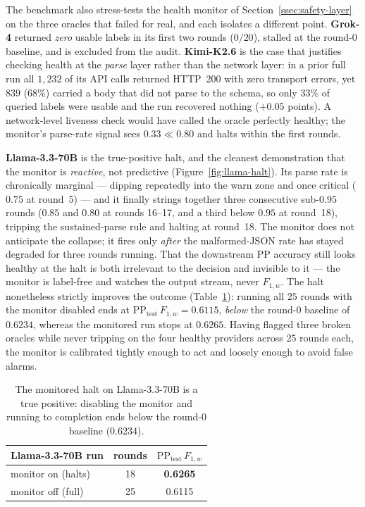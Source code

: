 The benchmark also stress-tests the health monitor of
Section~\ref{ssec:safety-layer} on the three oracles that failed for real, and
each isolates a different point. \textbf{Grok-4} returned \emph{zero} usable
labels in its first two rounds ($0/20$), stalled at the round-0 baseline, and is
excluded from the audit. \textbf{Kimi-K2.6} is the case that justifies checking
health at the \emph{parse} layer rather than the network layer: in a prior full
run all $1{,}232$ of its API calls returned HTTP~200 with zero transport errors,
yet $839$ ($68\%$) carried a body that did not parse to the schema, so only $33\%$
of queried labels were usable and the run recovered nothing ($+0.05$ points). A
network-level liveness check would have called the oracle perfectly healthy; the
monitor's parse-rate signal sees $0.33 \ll 0.80$ and halts within the first
rounds.

\textbf{Llama-3.3-70B} is the true-positive halt, and the cleanest demonstration
that the monitor is \emph{reactive}, not predictive (Figure~\ref{fig:llama-halt}).
Its parse rate is chronically marginal --- dipping repeatedly into the warn zone
and once critical ($0.75$ at round~5) --- and it finally strings together three
consecutive sub-$0.95$ rounds ($0.85$ and $0.80$ at rounds 16--17, and a third
below $0.95$ at round~18), tripping the sustained-parse rule and halting at
round~18. The monitor does not anticipate the collapse; it fires only \emph{after}
the malformed-JSON rate has stayed degraded for three rounds running. That the
downstream PP accuracy still looks healthy at the halt is both irrelevant to the
decision and invisible to it --- the monitor is label-free and watches the output
stream, never $F_{1,w}$. The halt nonetheless strictly improves the outcome
(Table~\ref{tab:llama}): running all $25$ rounds with the monitor disabled ends at
$\mathrm{PP_{test}}\,F_{1,w}=0.6115$, \emph{below} the round-0 baseline of
$0.6234$, whereas the monitored run stops at $0.6265$. Having flagged three broken
oracles while never tripping on the four healthy providers across $25$ rounds
each, the monitor is calibrated tightly enough to act and loosely enough to avoid
false alarms.

\begin{table}[h]
\centering
\caption{The monitored halt on Llama-3.3-70B is a true positive: disabling the
monitor and running to completion ends below the round-0 baseline ($0.6234$).}
\label{tab:llama}
\small
\begin{tabular}{@{}lcc@{}}
\toprule
Llama-3.3-70B run & rounds & $\mathrm{PP_{test}}\,F_{1,w}$ \\
\midrule
monitor on (halts) & 18 & \textbf{0.6265} \\
monitor off (full) & 25 & 0.6115 \\
\bottomrule
\end{tabular}
\end{table}


